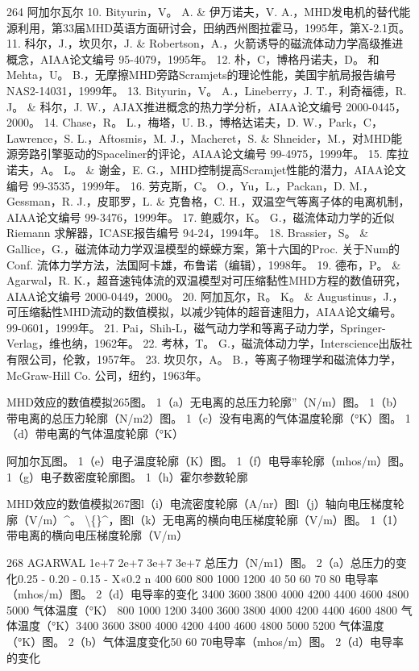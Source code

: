\documentclass[UTF8,11pt,a4paper,openany,fontset=fandol]{ctexbook}
\begin{document}
264 阿加尔瓦尔 10. Bityurin，V。 A. \& 伊万诺夫，V. A.，MHD发电机的替代能源利用，第33届MHD英语方面研讨会，田纳西州图拉霍马，1995年，第X-2.1页。 11. 科尔，J.，坎贝尔，J. \& Robertson，A.，火箭诱导的磁流体动力学高级推进概念，AIAA论文编号 95-4079，1995年。 12. 朴，C，博格丹诺夫，D。 和Mehta，U。 B.，无摩擦MHD旁路Scramjets的理论性能，美国宇航局报告编号 NAS2-14031，1999年。 13. Bityurin，V。 A.，Lineberry，J. T.，利奇福德，R. J。 \& 科尔，J. W.，AJAX推进概念的热力学分析，AIAA论文编号 2000-0445，2000。 14. Chase，R。 L.，梅塔，U. B.，博格达诺夫，D. W.，Park，C，Lawrence，S. L.，Aftosmis，M. J.，Macheret，S. \& Shneider，M.，对MHD能源旁路引擎驱动的Spaceliner的评论，AIAA论文编号 99-4975，1999年。 15. 库拉诺夫，A。 L。 \& 谢金，E. G.，MHD控制提高Scramjet性能的潜力，AIAA论文编号 99-3535，1999年。 16. 劳克斯，C。 O.，Yu，L.，Packan，D. M.，Gessman，R. J.，皮耶罗，L. \& 克鲁格，C. H.，双温空气等离子体的电离机制，AIAA论文编号 99-3476，1999年。 17. 鲍威尔，K。 G.，磁流体动力学的近似Riemann 求解器，ICASE报告编号 94-24，1994年。 18. Brassier，S。 \& Gallice，G.，磁流体动力学双温模型的蝾蝾方案，第十六国的Proc. 关于Num的Conf. 流体力学方法，法国阿卡雄，布鲁诺（编辑），1998年。 19. 德布，P。 \& Agarwal，R. K.，超音速钝体流的双温模型对可压缩黏性MHD方程的数值研究，AIAA论文编号 2000-0449，2000。 20. 阿加瓦尔，R。 K。 \& Augustinus，J.，可压缩黏性MHD流动的数值模拟，以减少钝体的超音速阻力，AIAA论文编号。 99-0601，1999年。 21. Pai，Shih-L，磁气动力学和等离子动力学，Springer-Verlag，维也纳，1962年。 22. 考林，T。 G.，磁流体动力学，Interscience出版社有限公司，伦敦，1957年。 23. 坎贝尔，A。 B.，等离子物理学和磁流体力学，McGraw-Hill Co. 公司，纽约，1963年。

MHD效应的数值模拟265图。 1（a）无电离的总压力轮廓”（N/m）图。 1（b）带电离的总压力轮廓（N/m2）图。 1（c）没有电离的气体温度轮廓（°K）图。 1（d）带电离的气体温度轮廓（°K）

阿加尔瓦图。 1（e）电子温度轮廓（K）图。 1（f）电导率轮廓（mhos/m）图。 1（g）电子数密度轮廓图。 1（h）霍尔参数轮廓

MHD效应的数值模拟267图l（i）电流密度轮廓（A/nr）图l（j）轴向电压梯度轮廓（V/m）\textasciicircum{}。 \textbackslash\{\}\textasciicircum{}，图l（k）无电离的横向电压梯度轮廓（V/m）图。 1（1）带电离的横向电压梯度轮廓（V/m）

268 AGARWAL 1e+7 2e+7 3e+7 3e+7 总压力（N/m1）图。 2（a）总压力的变化0.25 - 0.20 - 0.15 - X«0.2 n 400 600 800 1000 1200 40 50 60 70 80 电导率（mhos/m）图。 2（d）电导率的变化 3400 3600 3800 4000 4200 4400 4600 4800 5000 气体温度（°K） 800 1000 1200 3400 3600 3800 4000 4200 4400 4600 4800 气体温度（°K）3400 3600 3800 4000 4200 4400 4600 4800 5000 5200 气体温度（°K）图。 2（b）气体温度变化50 60 70电导率（mhos/m）图。 2（d）电导率的变化
\end{document}
